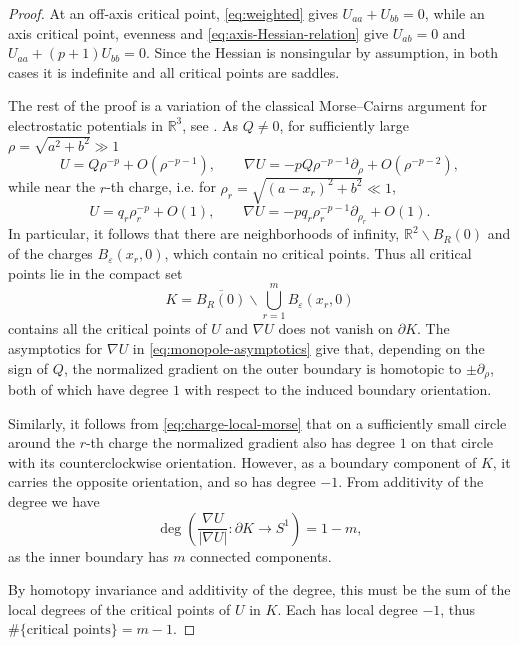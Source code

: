 \documentclass[leqno,11pt]{amsart}
\numberwithin{equation}{section}
\newcommand{\bbR}{\mathbb{R}}
\DeclareMathOperator\degmap{deg}
\theoremstyle{definition}
\begin{document}
	\begin{proof}
		At an off-axis critical point, \eqref{eq:weighted} gives $U_{aa}+U_{bb}=0$, while an axis critical point, evenness and \eqref{eq:axis-Hessian-relation} give $U_{ab}=0$ and $U_{aa}+(p+1)U_{bb}=0$. Since the Hessian is nonsingular by assumption, in both cases it is indefinite and all critical points are saddles.
		
		The rest of the proof is a variation of the classical Morse--Cairns argument for electrostatic potentials in $\bbR^3$, see \cite[Chapter~32]{MorseCairns}. As $Q\neq0$, for sufficiently large $\rho=\sqrt{a^2+b^2} \gg 1$
		\begin{equation}\label{eq:monopole-asymptotics}
			U=Q\rho^{-p}+O(\rho^{-p-1}),
			\qquad
			\nabla U=-pQ\rho^{-p-1}\partial_\rho+O(\rho^{-p-2}),
		\end{equation}
		while near the $r$-th charge, i.e. for $\rho_r=\sqrt{(a-x_r)^2+b^2} \ll 1$,
		\begin{equation}\label{eq:charge-local-morse}
			U=q_r\rho_r^{-p}+O(1),
			\qquad
			\nabla U=-pq_r\rho_r^{-p-1}\partial_{\rho_r}+O(1).
		\end{equation}
		In particular, it follows that there are neighborhoods of infinity, $\mathbb R^2 \backslash B_R(0)$ and of the charges $B_\varepsilon(x_r,0)$, which contain no critical points. Thus all critical points lie in the compact set
		\[
		K=\overline{B_R(0)}\backslash\bigcup_{r=1}^m B_\varepsilon(x_r,0)
		\]
		contains all the critical points of $U$ and $\nabla U$ does not vanish on $\partial K$. The asymptotics for $\nabla U$ in \eqref{eq:monopole-asymptotics} give that, depending on the sign of $Q$, the normalized gradient on the outer boundary is homotopic to $\pm \partial_\rho$, both of which have degree $1$ with respect to the induced boundary orientation.
		
		Similarly, it follows from \eqref{eq:charge-local-morse} that on a sufficiently small circle around the $r$-th charge the normalized gradient also has degree $1$ on that circle with its counterclockwise orientation. However, as a boundary component of $K$, it carries the opposite orientation, and so has degree $-1$. From additivity of the degree we have
		\[
		\degmap\left(
		\frac{\nabla U}{|\nabla U|}:\partial K\longrightarrow S^1
		\right)=1-m,
		\]
		as the inner boundary has $m$ connected components.
		
		By homotopy invariance and additivity of the degree, this must be the sum of the local degrees of the critical points of $U$ in $K$. Each has local degree $-1$, thus $\# \{ \text{critical points}\} =m-1$.
		

\end{proof}
\end{document}
